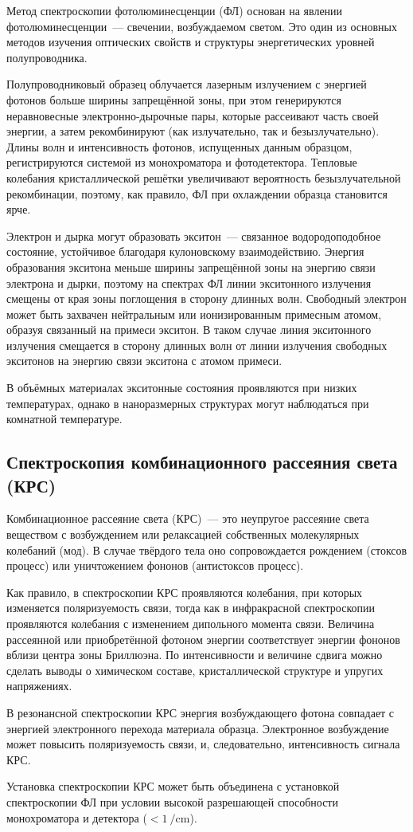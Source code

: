 Метод спектроскопии фотолюминесценции (ФЛ) основан на явлении
фотолюминесценции~--- свечении, возбуждаемом светом. Это один из основных
методов изучения оптических свойств и структуры энергетических уровней
полупроводника.

Полупроводниковый образец облучается лазерным излучением с энергией фотонов
больше ширины запрещённой зоны, при этом генерируются неравновесные
электронно-дырочные пары, которые рассеивают часть своей энергии, а затем
рекомбинируют (как излучательно, так и безызлучательно). Длины волн и
интенсивность фотонов, испущенных данным образцом, регистрируются системой из
монохроматора и фотодетектора. Тепловые колебания кристаллической решётки
увеличивают вероятность безызлучательной рекомбинации, поэтому, как правило, ФЛ
при охлаждении образца становится ярче.

Электрон и дырка могут образовать экситон~--- связанное водородоподобное
состояние, устойчивое благодаря кулоновскому взаимодействию. Энергия
образования экситона меньше ширины запрещённой зоны на энергию связи электрона
и дырки, поэтому на спектрах ФЛ линии экситонного излучения смещены от края
зоны поглощения в сторону длинных волн. Свободный электрон может быть захвачен
нейтральным или ионизированным примесным атомом, образуя связанный на примеси
экситон. В таком случае линия экситонного излучения смещается в сторону длинных
волн от линии излучения свободных экситонов на энергию связи экситона с атомом
примеси.

В объёмных материалах экситонные состояния проявляются при низких температурах,
однако в наноразмерных структурах могут наблюдаться при комнатной температуре.

\subsection{Спектроскопия комбинационного рассеяния света
(КРС)}\label{subsec:ch2/sec2/sub4}

Комбинационное рассеяние света (КРС)~--- это неупругое рассеяние света
веществом с возбуждением или релаксацией собственных молекулярных колебаний
(мод). В случае твёрдого тела оно сопровождается рождением (стоксов процесс)
или уничтожением фононов (антистоксов процесс).

Как правило, в спектроскопии КРС проявляются колебания, при которых изменяется
поляризуемость связи, тогда как в инфракрасной спектроскопии проявляются
колебания с изменением дипольного момента связи. Величина рассеянной или
приобретённой фотоном энергии соответствует энергии фононов вблизи центра зоны
Бриллюэна. По интенсивности и величине сдвига можно сделать выводы о химическом
составе, кристаллической структуре и упругих напряжениях.

В резонансной спектроскопии КРС энергия возбуждающего фотона совпадает с
энергией электронного перехода материала образца. Электронное возбуждение может
повысить поляризуемость связи, и, следовательно, интенсивность сигнала КРС.

Установка спектроскопии КРС может быть объединена с установкой спектроскопии ФЛ
при условии высокой разрешающей способности монохроматора и детектора (\(<
1~\si{\per\centi\meter}\)).

\FloatBarrier
